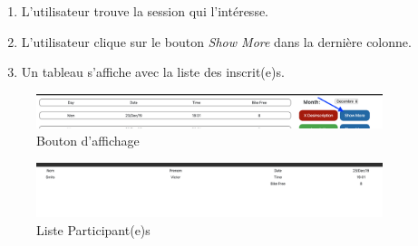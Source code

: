 \begin{enumerate}
	\item L'utilisateur trouve la session qui l'intéresse. 
	\item L'utilisateur clique sur le bouton \textit{Show More} dans la dernière colonne. 
	\item Un tableau s'affiche avec la liste des inscrit(e)s. 
\end{enumerate}

\vspace{\baselineskip}
\begin{figure}[h]
	\includegraphics[width=0.9\textwidth,center]{Figures/us6-1}
	\caption{Bouton d'affichage}
\end{figure}

\newpage
\begin{figure}[h]
	\includegraphics[width=0.9\textwidth,center]{Figures/us6-2}
	\caption{Liste Participant(e)s}
\end{figure}

